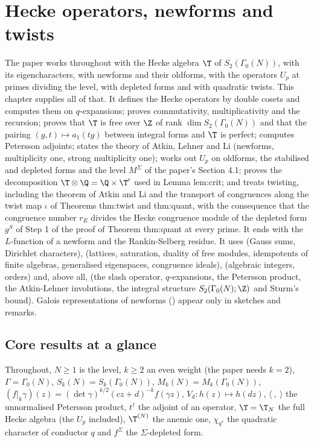 \chapter{Hecke operators, newforms and twists}\label{ch:hecke}

The paper works throughout with the Hecke algebra $\T$ of $S_2(\Gamma_0(N))$, with its eigencharacters, with newforms and their oldforms, with the operators $U_p$
at primes dividing the level, with depleted forms and with quadratic twists. This chapter supplies all of that. It defines the Hecke operators by double cosets and
computes them on $q$-expansions; proves commutativity, multiplicativity and the recursion; proves that $\T$ is free over $\Z$ of rank $\dim S_2(\Gamma_0(N))$ and that
the pairing $(g,t)\mapsto a_1(tg)$ between integral forms and $\T$ is perfect; computes Petersson adjoints; states the theory of Atkin, Lehner and Li (newforms,
multiplicity one, strong multiplicity one); works out $U_p$ on oldforms, the stabilised and depleted forms and the level $M^\Sigma$ of the paper's Section 4.1; proves
the decomposition $\T\otimes\Q=\Q\times\T'$ used in Lemma lem:crit; and treats twisting, including the theorem of Atkin and Li and the transport of congruences along
the twist map $\iota$ of Theorems thm:twist and thm:quant, with the consequence that the congruence number $r_E$ divides the Hecke congruence module of the depleted form
$g^S$ of Step 1 of the proof of Theorem thm:quant at every prime. It ends with the $L$-function of a newform and the Rankin-Selberg residue. It uses  (Gauss
sums, Dirichlet characters),  (lattices, saturation, duality of free modules, idempotents of finite algebras, generalised eigenspaces, congruence
ideals),  (algebraic integers, orders) and, above all,  (the slash operator, $q$-expansions, the Petersson product, the Atkin-Lehner
involutions, the integral structure $S_2(\Gamma_0(N);\Z)$ and Sturm's bound). Galois representations of newforms () appear only in sketches and
remarks.

\section*{Core results at a glance}

Throughout, $N\ge1$ is the level, $k\ge2$ an even weight (the paper needs $k=2$), $\Gamma=\Gamma_0(N)$, $S_k(N)=S_k(\Gamma_0(N))$, $M_k(N)=M_k(\Gamma_0(N))$,
$(f|_k\gamma)(z)=(\det\gamma)^{k/2}(cz+d)^{-k}f(\gamma z)$, $V_d\colon h(z)\mapsto h(dz)$, $\langle\ ,\ \rangle$ the unnormalised Petersson product, $t^\dagger$ the adjoint of an
operator, $\T=\T_N$ the full Hecke algebra (the $U_p$ included), $\T^{(N)}$ the anemic one, $\chi_{q^*}$ the quadratic character of conductor $q$ and $f^\Sigma$ the
$\Sigma$-depleted form.

